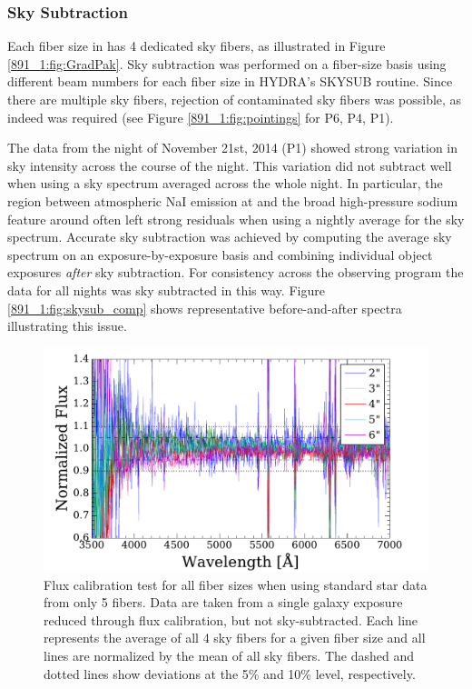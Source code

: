 \subsubsection{Sky Subtraction}
\label{891_1:sec:skysub}

Each fiber size in \GP has 4 dedicated sky fibers, as illustrated in
Figure \ref{891_1:fig:GradPak}.  Sky subtraction was performed on a
fiber-size basis using different beam numbers for each fiber size in
HYDRA's SKYSUB routine.  Since there are multiple sky fibers,
rejection of contaminated sky fibers was possible, as indeed was
required (see Figure \ref{891_1:fig:pointings} for P6, P4, P1).

The data from the night of November 21st, 2014 (P1) showed strong
variation in sky intensity across the course of the night. This
variation did not subtract well when using a sky spectrum averaged
across the whole night. In particular, the region between atmospheric
NaI emission at  and the broad high-pressure sodium
feature around  often left strong residuals when using
a nightly average for the sky spectrum. Accurate sky subtraction was
achieved by computing the average sky spectrum on an
exposure-by-exposure basis and combining individual object exposures
\emph{after} sky subtraction. For consistency across the observing
program the data for all nights was sky subtracted in this way. Figure
\ref{891_1:fig:skysub_comp} shows representative before-and-after spectra
illustrating this issue.

\begin{figure}
  \centering
  \includegraphics[width=\columnwidth]{891_1/figs/flux_cal_test.pdf}
  \caption[Comparison of flux calibration across multiple fiber
    sizes]{ \label{891_1:fig:sky_flux_comp}\fixspacing Flux
    calibration test for all fiber sizes when using standard star data
    from only 5 fibers. Data are taken from a single galaxy
    exposure reduced through flux calibration, but not
    sky-subtracted. Each line represents the average of all 4 sky
    fibers for a given fiber size and all lines are normalized by the
    mean of all sky fibers. The dashed and dotted lines show
    deviations at the 5\% and 10\% level, respectively.}
\end{figure}

